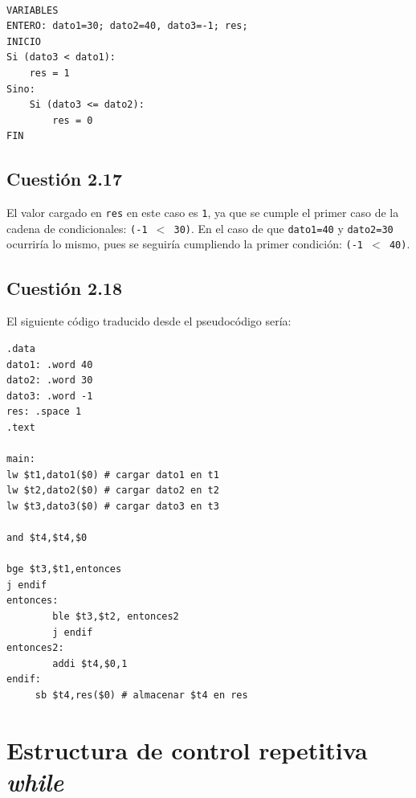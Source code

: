 \documentclass[11pt]{article}
\begin{document}
\begin{large}
\begin{flushleft}
\begin{listing}[h]
\begin{verbatim}

VARIABLES
ENTERO: dato1=30; dato2=40, dato3=-1; res;
INICIO
Si (dato3 < dato1):
    res = 1
Sino:
    Si (dato3 <= dato2):
        res = 0
FIN
\end{verbatim}
\end{listing}

\newpage



\subsection*{Cuestión 2.17}
El valor cargado en \texttt{res} en este caso es \texttt{1}, ya que se cumple el primer caso de la cadena de condicionales: \texttt{(-1 $<$ 30)}. En el caso de que \texttt{dato1=40} y \texttt{dato2=30} ocurriría lo mismo, pues se seguiría cumpliendo la primer condición: \texttt{(-1 $<$ 40)}.

\subsection*{Cuestión 2.18}
El siguiente código traducido desde el pseudocódigo sería:
\begin{listing}[h]
\begin{verbatim}
.data
dato1: .word 40
dato2: .word 30
dato3: .word -1
res: .space 1
.text

main: 
lw $t1,dato1($0) # cargar dato1 en t1
lw $t2,dato2($0) # cargar dato2 en t2
lw $t3,dato3($0) # cargar dato3 en t3

and $t4,$t4,$0

bge $t3,$t1,entonces
j endif
entonces:
        ble $t3,$t2, entonces2
        j endif
entonces2:
        addi $t4,$0,1
endif:
     sb $t4,res($0) # almacenar $t4 en res

\end{verbatim}
\end{listing}


\section*{Estructura de control repetitiva \textit{while}}


\end{flushleft}
\end{large}
\end{document}

